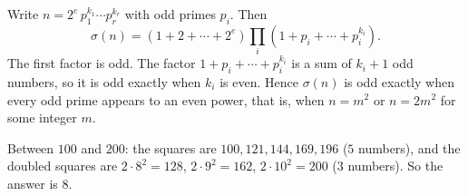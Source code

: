Write $n=2^e\,p_1^{k_1}\cdots p_r^{k_r}$ with odd primes $p_i$. Then
\[\sigma(n)=\left(1+2+\cdots+2^e\right)\prod_{i}\left(1+p_i+\cdots+p_i^{k_i}\right).\]
The first factor is odd. The factor $1+p_i+\cdots+p_i^{k_i}$ is a sum of $k_i+1$ odd numbers, so it is odd exactly when $k_i$ is even. Hence $\sigma(n)$ is odd exactly when every odd prime appears to an even power, that is, when $n=m^2$ or $n=2m^2$ for some integer $m$.

Between $100$ and $200$: the squares are $100,121,144,169,196$ ($5$ numbers), and the doubled squares are $2\cdot8^2=128$, $2\cdot9^2=162$, $2\cdot10^2=200$ ($3$ numbers). So the answer is $\boxed{8}$.
